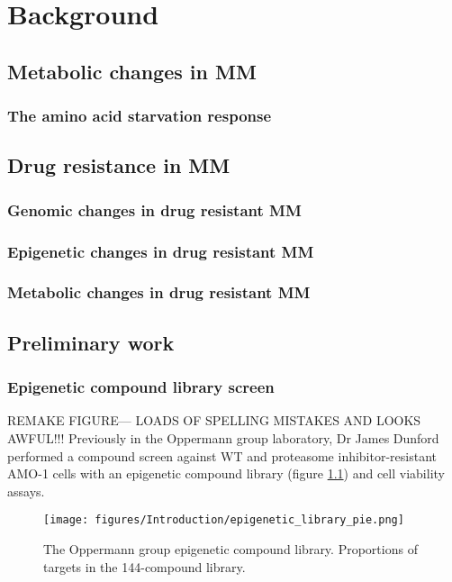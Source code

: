 \chapter{\label{ch:2-litreview}Background}


\section{Metabolic changes in MM}

\subsection{The amino acid starvation response}

\section{Drug resistance in MM}

\subsection{Genomic changes in drug resistant MM}


\subsection{Epigenetic changes in drug resistant MM}


\subsection{Metabolic changes in drug resistant MM}


\section{Preliminary work}\label{sec:preliminary}
\subsection{Epigenetic compound library screen}
REMAKE FIGURE--- LOADS OF SPELLING MISTAKES AND LOOKS AWFUL!!!
Previously in the Oppermann group laboratory, Dr James Dunford performed a compound screen against WT and proteasome inhibitor-resistant AMO-1 cells with an epigenetic compound library (figure \ref{fig:epigenetic_pie}) and cell viability assays.

\begin{figure}[htb]
\centering\texttt{[image: figures/Introduction/epigenetic\_library\_pie.png]}
\caption[Epigenentic compound library pie chart]{The Oppermann group epigenetic compound library.
Proportions of targets in the 144-compound library. }
\label{fig:epigenetic_pie}
\end{figure}

